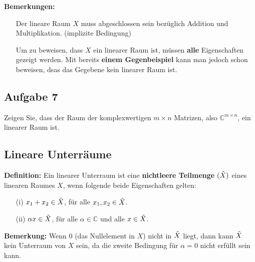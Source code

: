 \documentclass[11pt]{article}
\begin{document}
\textbf{Bemerkungen:}
\vspace*{-0.5cm}
\begin{itemize}[leftmargin=0pt]
    \item[] Der lineare Raum $X$ muss abgeschlossen sein bezüglich Addition und Multiplikation. (implizite Bedingung)
    \item[] Um zu beweisen, dass $X$ ein linearer Raum ist, müssen \textbf{alle} Eigenschaften gezeigt werden. Mit bereits \textbf{einem Gegenbeispiel} kann man jedoch schon beweisen, dsas das Gegebene kein linearer Raum ist.
\end{itemize}


\subsection*{Aufgabe 7}
\vspace*{-0.5cm}
Zeigen Sie, dass der Raum der komplexwertigen $m\times n$ Matrizen, also $\mathbb{C}^{m\times n}$, ein linearer Raum ist.


\pagebreak

\subsection*{Lineare Unterräume}
\vspace*{-0.5cm}
\textbf{Definition:} Ein linearer Unterraum ist eine \textbf{nichtleere Teilmenge} $(\Tilde{X})$ eines linearen Raumes $X$, wenn folgende beide Eigenschaften gelten:
\vspace*{-0.5cm}
\begin{itemize}
    \item[(i)] $x_1 + x_2 \in \Tilde{X}$, für alle $x_1, x_2 \in \Tilde{X}$.
    \item[(ii)] $\alpha x \in \Tilde{X}$, für alle $\alpha \in \mathbb{C}$ und alle $x\in \Tilde{X}$.
\end{itemize}
\vspace*{-0.5cm}
\textbf{Bemerkung:} Wenn $0$ (das Nullelement in $X$) nicht in $\Tilde{X}$ liegt, dann kann $\Tilde{X}$ kein Unterraum von $X$ sein, da die zweite Bedingung für $\alpha = 0$ nicht erfüllt sein kann.
\end{document}

